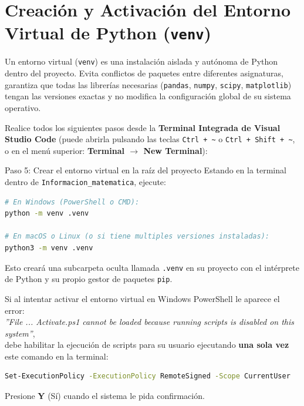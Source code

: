 \documentclass[11pt,a4paper]{article}
\begin{document}
\section{Creación y Activación del Entorno Virtual de Python (\texttt{venv})}

\begin{conceptbox}[title=¿Por qué es indispensable crear un entorno virtual?]
Un entorno virtual (\texttt{venv}) es una instalación aislada y autónoma de Python dentro del proyecto. Evita conflictos de paquetes entre diferentes asignaturas, garantiza que todas las librerías necesarias (\texttt{pandas}, \texttt{numpy}, \texttt{scipy}, \texttt{matplotlib}) tengan las versiones exactas y no modifica la configuración global de su sistema operativo.
\end{conceptbox}

Realice todos los siguientes pasos desde la \textbf{Terminal Integrada de Visual Studio Code} (puede abrirla pulsando las teclas \texttt{Ctrl + \~{}} o \texttt{Ctrl + Shift + \~{}}, o en el menú superior: \textbf{Terminal $\rightarrow$ New Terminal}):

\begin{stepbox}{Paso 5: Crear el entorno virtual en la raíz del proyecto}
Estando en la terminal dentro de \texttt{Informacion\_matematica}, ejecute:
\begin{lstlisting}[language=bash]
# En Windows (PowerShell o CMD):
python -m venv .venv

# En macOS o Linux (o si tiene multiples versiones instaladas):
python3 -m venv .venv
\end{lstlisting}
Esto creará una subcarpeta oculta llamada \texttt{.venv} en su proyecto con el intérprete de Python y su propio gestor de paquetes \texttt{pip}.
\end{stepbox}

\begin{alertbox}[title=Atención en Windows PowerShell: Error de Políticas de Ejecución]
Si al intentar activar el entorno virtual en Windows PowerShell le aparece el error:\\
\textit{\textcolor{rojoAlerta}{''File ... Activate.ps1 cannot be loaded because running scripts is disabled on this system''}},\\
debe habilitar la ejecución de scripts para su usuario ejecutando \textbf{una sola vez} este comando en la terminal:
\begin{lstlisting}[language=bash]
Set-ExecutionPolicy -ExecutionPolicy RemoteSigned -Scope CurrentUser
\end{lstlisting}
Presione \textbf{Y} (Sí) cuando el sistema le pida confirmación.
\end{alertbox}
\end{document}

